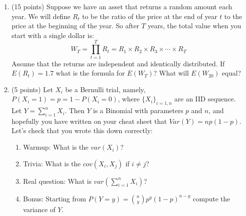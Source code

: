 \documentclass[14pt]{extarticle}
\begin{document}
\begin{enumerate}
\vfill

\item (15 points) Suppose we have an asset that returns a random amount each
year.  We will define $R_t$ to be the ratio of the price at the end
of year $t$ to the price at the beginning of the year.  So after $T$
years, the total value when you start with a single dollar is:
\begin{displaymath}
W_T = \prod_{t=1}^T R_t = R_1 \times R_2 \times R_3 \times \cdots
\times R_T
\end{displaymath}
Assume that the returns are independent and identically distributed. 
If $E(R_t) = 1.7$ what is the formula for $E(W_T)$?  What will
$E(W_{20})$ equal?

\vfill

\item (5 points) Let $X_i$ be a Bernulli trial, namely, $P(X_i = 1) =
 p = 1 - P(X_i = 0)$, where $\{X_i\}_{i=1,n}$ are an IID
 sequence.  Let $Y = \sum_{i=1}^n X_i$.  Then $Y$ is a Binomial with
 parameters $p$ and $n$, and hopefully you have written on your cheat
 sheet that $Var(Y) = np(1-p)$.  Let's check that you wrote this down
 correctly:
\begin{enumerate}
\item Warmup: What is the $var(X_i)$?
\item Trivia: What is the $cov(X_i,X_j)$ if $i \ne j$?
\item Real question: What is $var(\sum_{i=1}^n X_i)$?
\item Bonus: Starting from $P(Y = y) = {n \choose y}p^y(1-p)^{n-y}$
compute the variance of $Y$.
\end{enumerate}

\end{enumerate}
\end{document}
